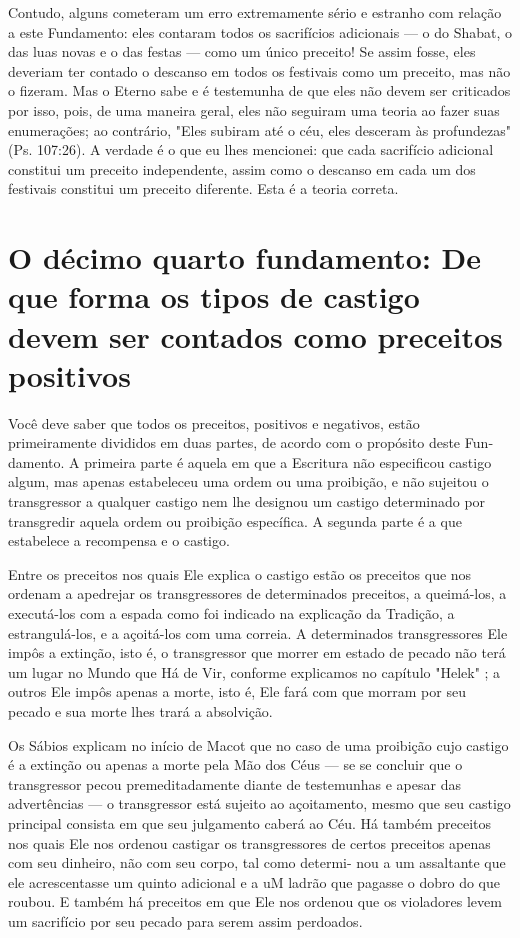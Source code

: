\begin{itemize}
\begin{enumrate}
\begin{itemize}
Contudo, alguns cometeram um erro extremamente sério e estranho com
relação a este Fundamento: eles contaram todos os sacrifícios adicionais
--- o do Shabat, o das luas novas e o das festas --- como um único
preceito! Se assim fosse, eles deveriam ter contado o descanso em todos
os festivais co­mo um preceito, mas não o fizeram. Mas o Eterno sabe e é
testemunha de que eles não devem ser criticados por isso, pois, de uma
maneira geral, eles não seguiram uma teoria ao fazer suas enumerações;
ao contrário, "Eles subiram até o céu, eles desceram às profundezas"
(Ps. 107:26). A verdade é o que eu lhes mencionei: que cada sacrifício
adicional constitui um preceito indepen­dente, assim como o descanso em
cada um dos festivais constitui um preceito diferente. Esta é a teoria
correta.

\chapter{O décimo quarto fundamento: De que forma os tipos de castigo devem ser contados
como preceitos positivos}

Você deve saber que todos os preceitos, positivos e negativos, estão
primeiramente divididos em duas partes, de acordo com o propósito deste
Fun­damento. A primeira parte é aquela em que a Escritura não
especificou castigo algum, mas apenas estabeleceu uma ordem ou uma
proibição, e não sujeitou o transgressor a qualquer castigo nem lhe
designou um castigo determinado por transgredir aquela ordem ou
proibição específica. A segunda parte é a que estabelece a recompensa e
o castigo.

Entre os preceitos nos quais Ele explica o castigo estão os preceitos
que nos ordenam a apedrejar os transgressores de determinados preceitos,
a queimá-los, a executá-los com a espada como foi indicado na explicação
da Tra­dição, a estrangulá-los, e a açoitá-los com uma correia. A
determinados trans­gressores Ele impôs a extinção, isto é, o
transgressor que morrer em estado de pecado não terá um lugar no Mundo
que Há de Vir, conforme explicamos no capítulo "Helek" ; a outros Ele
impôs apenas a morte, isto é, Ele fará com que morram por seu pecado e
sua morte lhes trará a absolvição.

Os Sábios explicam no início de Macot que no caso de uma proibi­ção cujo
castigo é a extinção ou apenas a morte pela Mão dos Céus --- se se
concluir que o transgressor pecou premeditadamente diante de testemunhas
e apesar das advertências --- o transgressor está sujeito ao
açoitamento, mesmo que seu castigo principal consista em que seu
julgamento caberá ao Céu. Há também preceitos nos quais Ele nos ordenou
castigar os transgressores de cer­tos preceitos apenas com seu dinheiro,
não com seu corpo, tal como determi-
nou a um assaltante que ele acrescentasse um quinto adicional e a uM
ladrão que pagasse o dobro do que roubou. E também há preceitos em que
Ele nos ordenou que os violadores levem um sacrifício por seu pecado
para serem as­sim perdoados.


\end{itemize}
\end{enumrate}
\end{itemize}
